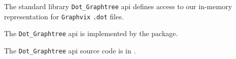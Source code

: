
The standard library {\tt Dot\_Graphtree} api defines access to our in-memory representation 
for {\tt Graphvix} {\tt .dot} files.

The {\tt Dot\_Graphtree} api is implemented by the  package.

The {\tt Dot\_Graphtree} api source code is in .
